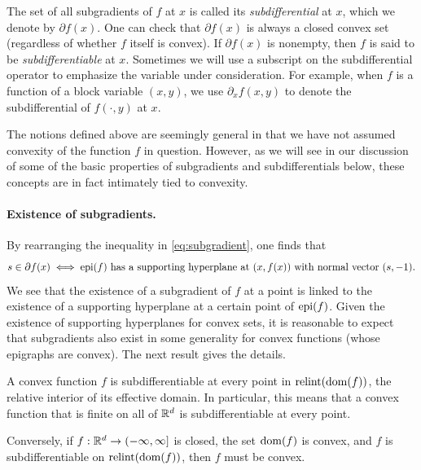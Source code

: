 The set of all subgradients of $f$ at $x$ is called its \emph{subdifferential}
at $x$, which we denote by $\partial f(x)$. One can check that $\partial f(x)$
is always a closed convex set (regardless of whether $f$ itself is convex).  If
$\partial f(x)$ is nonempty, then $f$ is said to be \emph{subdifferentiable} at
$x$. Sometimes we will use a subscript on the subdifferential operator to
emphasize the variable under consideration. For example, when $f$ is a function 
of a block variable $(x,y)$, we use $\partial_x f(x,y)$ to denote the
subdifferential of $f(\cdot, y)$ at $x$.

The notions defined above are seemingly general in that we have not assumed 
convexity of the function $f$ in question. However, as we will see in our 
discussion of some of the basic properties of subgradients and subdifferentials
below, these concepts are in fact intimately tied to convexity.   

\paragraph{Existence of subgradients.}

By rearranging the inequality in \eqref{eq:subgradient}, one finds that 
\[
s \in \partial f(x) \iff \text{$\operatorname{epi}(f)$ has a supporting hyperplane at
  $(x, f(x))$ with normal vector $(s, -1)$.}
\]
We see that the existence of a subgradient of $f$ at a point is linked to the
existence of a supporting hyperplane at a certain point of $\operatorname{epi}(f)$. Given the
existence of supporting hyperplanes for convex sets, it is reasonable to expect
that subgradients also exist in some generality for convex functions (whose
epigraphs are convex). The next result gives the details.

\begin{Theorem}
\label{thm:subgradient_existence}
A convex function $f$ is subdifferentiable at every point in $\operatorname{relint}(\operatorname{dom}(f))$,
the relative interior of its effective domain. In particular, this means that a
convex function that is finite on all of $\mathbb{R}^d$ is subdifferentiable at every
point.   

\setlength{\parindent}{\normalparindent}
Conversely, if $f : \mathbb{R}^d \to (-\infty, \infty]$ is closed, the set $\operatorname{dom}(f)$ is
convex, and $f$ is subdifferentiable on $\operatorname{relint}(\operatorname{dom}(f))$, then $f$ must be
convex.          
\end{Theorem}

